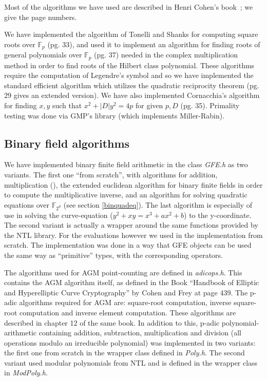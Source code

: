 \documentclass[11pt,english]{article}
\begin{document}
Most of the algorithms we have used are described in Henri Cohen's book~\cite{Co96}; we give the page numbers.

We have implemented the algorithm of Tonelli and Shanks for computing square roots over $\mathbb{F}_p$ (pg. 33), and used 
it to implement an algorithm for finding roots of general polynomials over $\mathbb{F}_p$ (pg. 37) needed in the complex multiplication
method in order to find roots of the Hilbert class polynomial. These algorithms require the computation of Legendre's symbol
and so we have implemented the standard efficient algorithm which utilizes the quadratic reciprocity theorem (pg. 29 gives an extended version).
We have also implemented Cornacchia's algorithm for finding $x,y$ such that $x^2+|D|y^2=4p$ for given $p,D$ (pg. 35).
Primality testing was done via GMP's library (which implements Miller-Rabin). 

\subsection{Binary field algorithms}
We have implemented binary finite field arithmetic in the class \emph{GFE.h} as two variants. The first one ``from scratch'', with algorithms for addition, multiplication (\cite{715867}), the extended euclidean algorithm for binary finite fields in order to compute the multiplicative inverse, and an algorithm for solving quadratic equations over $\mathbb{F}_{2^d}$ (see section \ref{binquadeq}). The last algorithm is especially of use in solving the curve-equation ($y^2+xy=x^3+ax^2+b$) to the y-coordinate. The second variant is actually a wrapper around the same functions provided by the NTL library. For the evaluations however we used in the implementation from scratch. The implementation was done in a way that GFE objects can be used the same way as ``primitive'' types, with the corresponding operators.

The algorithms used for AGM point-counting are defined in \emph{adicops.h}. This contains the AGM algorithm itself, as defined in the Book ``Handbook of Elliptic and Hyperelliptic Curve Cryptography'' by Cohen and Frey \cite{handbook} at page 439. The p-adic algorithms required for AGM are: square-root computation, inverse square-root computation and inverse element computation. These algorithms are described in chapter 12 of the same book. In addition to this, p-adic polynomial-arithmetic containing addition, subtraction, multiplication and division (all operations modulo an irreducible polynomial) was implemented in two variants: the first one from scratch in the wrapper class defined in \emph{Poly.h}. The second variant used modular polynomials from NTL and is defined in the wrapper class in \emph{ModPoly.h}.
\end{document}
